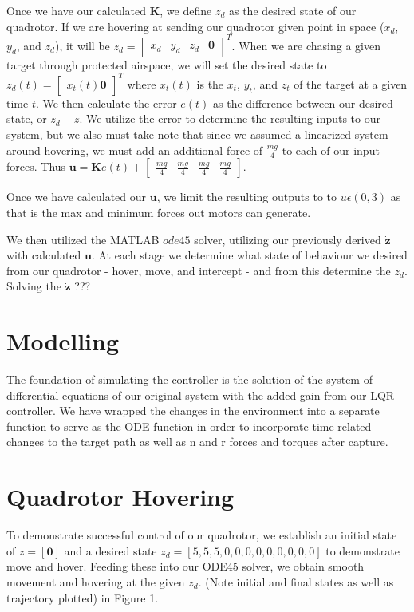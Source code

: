 \documentclass{article}
\begin{document}
\begin{multicols}{2}
Once we have our calculated $\boldsymbol{K}$, we define $z_d$ as the desired state of our quadrotor. If we are hovering at sending our quadrotor given point in space ($x_d$, $y_d$, and $z_d$), it will be $z_d=\begin{bmatrix} x_d & y_d & z_d & \boldsymbol{0} \end{bmatrix}^T$. When we are chasing a given target through protected airspace, we will set the desired state to $z_d(t)=\begin{bmatrix} x_t(t) \boldsymbol{0} \end{bmatrix}^T$ where $x_t(t)$ is the $x_t$, $y_t$, and $z_t$ of the target at a given time $t$. We then calculate the error $e(t)$ as the difference between our desired state, or $z_d - z$. We utilize the error to determine the resulting inputs to our system, but we also must take note that since we assumed a linearized system around hovering, we must add an additional force of $\frac{mg}{4}$ to each of our input forces. Thus $\boldsymbol{u}= \boldsymbol{K}e(t) + \begin{bmatrix}\frac{mg}{4} & \frac{mg}{4} & \frac{mg}{4} & \frac{mg}{4}\end{bmatrix}$. 

Once we have calculated our $\boldsymbol{u}$, we limit the resulting outputs to to $u \epsilon (0, 3)$ as that is the max and minimum forces out motors can generate.

We then utilized the MATLAB $\textit{ode45}$ solver, utilizing our previously derived $\boldsymbol{\dot{z}}$ with calculated $\boldsymbol{u}$. At each stage we determine what state of behaviour we desired from our quadrotor - hover, move, and intercept - and from this determine the $z_d$. Solving the $\boldsymbol{\dot{z}}$ ???

\section*{Modelling}

\noindent
The foundation of simulating the controller is the solution of the system of differential equations of our original system with the added gain from our LQR controller.  We have wrapped the changes in the environment into a separate function to serve as the ODE function in order to incorporate time-related changes to the target path as well as n and r forces and torques after capture.
\section*{Quadrotor Hovering}
To demonstrate successful control of our quadrotor, we establish an initial state of $z=[\mathbf{0}]$ and a desired state $z_d=[5,5,5,0,0,0,0,0,0,0,0,0] $ to demonstrate move and hover.  Feeding these into our ODE45 solver, we obtain smooth movement and hovering at the given $z_d$.  (Note initial and final states as well as trajectory plotted) in Figure 1.

\end{multicols}
\end{document}
